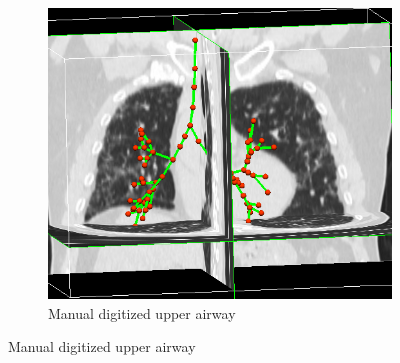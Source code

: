 \begin{figure}[htbp] 
\centering
\begin{subfigure}{.51\linewidth}%
  \includegraphics[width=\linewidth,trim={{.0\wd0} {.0\wd0} {.0\wd0} {.0\wd0}},clip]{ModelBasedAnalysis/Image/UpperAirwayDigitizing.png}
  \caption{Manual digitized upper airway}
  \label{fig:AirwayGeneration-a} 
\end{subfigure}

\end{figure}
